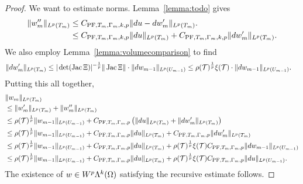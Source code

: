 \documentclass[12pt,a4paper]{article}
\begin{document}
\begin{proof}
    We want to estimate norms. 
    Lemma~\ref{lemma:todo} gives 
    \begin{align*}
        \| w''_{m} \|_{L^{p}(T_{m})} 
        &
        \leq 
        C_{{\rm PF},T_{m},\Gamma_{m},k,p} \| d u - d w'_{m} \|_{L^{p}(T_{m})}.
        \\&
        \leq 
        C_{{\rm PF},T_{m},\Gamma_{m},k,p} \| d u      \|_{L^{p}(T_{m})} 
        + 
        C_{{\rm PF},T_{m},\Gamma_{m},k,p} \| d w'_{m} \|_{L^{p}(T_{m})} 
        .
    \end{align*}
    We also employ Lemma~\ref{lemma:volumecomparison} to find 
    \begin{align*}
        \| d w'_{m} \|_{L^{p}(T_{m})}
        &\leq 
        |\det(\operatorname{{\rm Jac}} \Xi  )|^{-\frac 1 p} 
        \| \operatorname{{\rm Jac}} \Xi   \|
        \cdot 
        \| d w_{m-1} \|_{L^{p}(U_{m-1})}
        \leq 
        \rho({\mathcal T})^{\frac 1 p} \xi({\mathcal T})
        \cdot 
        \| d w_{m-1} \|_{L^{p}(U_{m-1})}
        .
    \end{align*}
    Putting this all together, 
    \begin{align*}
        &
        \| w_{m} \|_{L^{p}(T_{m})}
        \\&
        \leq  
        \| w'_{m} \|_{L^{p}(T_{m})}
        + 
        \| w''_{m} \|_{L^{p}(T_{m})}
        \\&
        \leq  
        \rho({\mathcal T})^{\frac 1 p} 
        \| w_{m-1} \|_{L^{p}(U_{m-1})} 
        + 
        C_{{\rm PF},T_{m},\Gamma_{m},p} 
        \left( 
            \| d u \|_{L^{p}(T_{m})} 
            + 
            \| d w'_{m} \|_{L^{p}(T_{m})} 
        \right) 
        \\&
        \leq  
        \rho({\mathcal T})^{\frac 1 p} 
        \| w_{m-1} \|_{L^{p}(U_{m-1})} 
        + 
        C_{{\rm PF},T_{m},\Gamma_{m},p} 
        \| d u \|_{L^{p}(T_{m})} 
        + 
        C_{{\rm PF},T_{m},\Gamma_{m},p} 
        \| d w'_{m} \|_{L^{p}(T_{m})} 
        \\&
        \leq  
        \rho({\mathcal T})^{\frac 1 p} 
        \| w_{m-1} \|_{L^{p}(U_{m-1})} 
        + 
        C_{{\rm PF},T_{m},\Gamma_{m},p} 
        \| d u \|_{L^{p}(T_{m})} 
        + 
        \rho({\mathcal T})^{\frac 1 p} \xi({\mathcal T})
        C_{{\rm PF},T_{m},\Gamma_{m},p} 
        \| d w_{m-1} \|_{L^{p}(U_{m-1})} 
        \\&
        \leq  
        \rho({\mathcal T})^{\frac 1 p} 
        \| w_{m-1} \|_{L^{p}(U_{m-1})} 
        + 
        C_{{\rm PF},T_{m},\Gamma_{m},p} 
        \| d u \|_{L^{p}(T_{m})} 
        + 
        \rho({\mathcal T})^{\frac 1 p} \xi({\mathcal T})
        C_{{\rm PF},T_{m},\Gamma_{m},p} 
        \| d u \|_{L^{p}(U_{m-1})} 
        .
    \end{align*}
    The existence of $w \in W^{p}\Lambda^{k}(\Omega)$ satisfying the recursive estimate follows. 
\end{proof}
\end{document}
